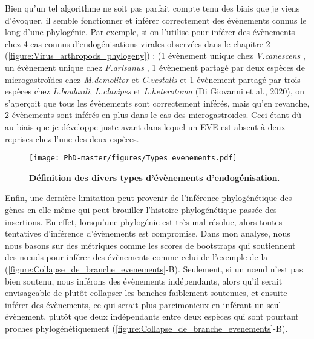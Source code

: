\begin{itemize}
 \end{itemize}  
  
Bien qu'un tel algorithme ne soit pas parfait compte tenu des biais que je viens d'évoquer, il semble fonctionner et inférer correctement des évènements connus le long d'une phylogénie. Par exemple, si on l'utilise pour inférer des évènements chez 4 cas connus d'endogénisations virales observées dans le \hyperref[sec:chap2]{chapitre 2}  (\figurename{\ref{figure:Virus_arthropods_phylogeny}}) : (1 évènement unique chez \textit{V.canescens} \citep{pichon_recurrent_2015}, un évènement unique chez \textit{F.arisanus} \citep{burke_rapid_2018}, 1 évènement partagé par deux espèces de microgastroïdes chez \textit{M.demolitor} et \textit{C.vestalis} \citep{bezier_polydnaviruses_2009} et 1 évènement partagé par trois espèces chez \textit{L.boulardi}, \textit{L.clavipes} et \textit{L.heterotoma} (Di Giovanni et al., 2020), on s'aperçoit que tous les évènements sont correctement inférés, mais qu'en revanche, 2 évènements sont inférés en plus dans le cas des microgastroïdes. Ceci étant dû au biais que je développe juste avant dans lequel un EVE est absent à deux reprises chez l'une des deux espèces.

\begin{figure}[!htpb]
\captionsetup{font=footnotesize}
 \centering
  \texttt{[image: PhD-master/figures/Types\_evenements.pdf]}
\caption[Methode:Définition des divers types d'évènements d'endogénisation]{\textbf{Définition des divers types d'évènements d'endogénisation}.}
\label{figure:Types_evenements}
\end{figure}

Enfin, une dernière limitation peut provenir de l'inférence phylogénétique des gènes en elle-même qui peut brouiller l'histoire phylogénétique passée des insertions. En effet, lorsqu'une phylogénie est très mal résolue, alors toutes tentatives d'inférence d'évènements est compromise. Dans mon analyse, nous nous basons sur des métriques comme les scores de bootstraps qui soutiennent des nœuds pour inférer des évènements comme celui de l’exemple de la  (\figurename{\ref{figure:Collapse_de_branche_evenements}}-B). Seulement, si un nœud n'est pas bien soutenu, nous inférons des évènements indépendants, alors qu'il serait envisageable de plutôt collapser les banches faiblement soutenues, et ensuite inférer des évènements, ce qui serait plus parcimonieux en inférant un seul évènement, plutôt que deux indépendants entre deux espèces qui sont pourtant proches phylogénétiquement (\figurename{\ref{figure:Collapse_de_branche_evenements}}-B). 


